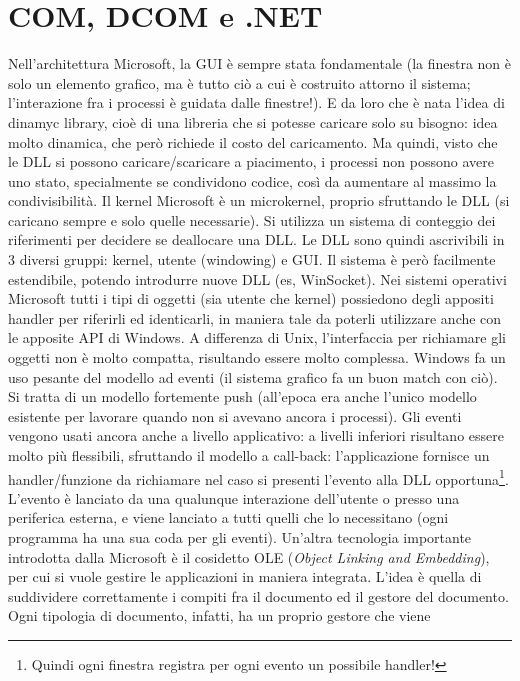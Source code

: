 \section{COM, DCOM e .NET}
Nell'architettura Microsoft, la GUI è sempre stata fondamentale (la finestra non è solo un elemento grafico, ma è tutto
ciò a cui è costruito attorno il sistema; l'interazione fra i processi è guidata dalle finestre!). E da loro che è nata
l'idea di dinamyc library, cioè di una libreria che si potesse caricare solo su bisogno: idea molto dinamica, che però 
richiede il costo del caricamento.
Ma quindi, visto che le DLL si possono caricare/scaricare a piacimento, i processi non possono avere uno stato, 
specialmente se condividono codice, così  da aumentare al massimo la condivisibilità. Il kernel Microsoft è un 
microkernel, proprio sfruttando le DLL (si caricano sempre e solo quelle necessarie).
Si utilizza un sistema di conteggio dei riferimenti per decidere se deallocare una DLL.
Le DLL sono quindi ascrivibili in 3 diversi gruppi: kernel, utente (windowing) e GUI. Il sistema è però facilmente
estendibile, potendo introdurre nuove DLL (es, WinSocket).
Nei sistemi operativi Microsoft tutti i tipi di oggetti (sia utente che kernel) possiedono degli appositi handler per 
riferirli ed identicarli, in maniera tale da poterli utilizzare anche con le apposite API di Windows. A differenza di 
Unix, l'interfaccia per richiamare gli oggetti non è molto compatta, risultando essere molto complessa.
Windows fa un uso pesante del modello ad eventi (il sistema grafico fa un buon match con ciò). Si tratta di un modello 
fortemente push (all'epoca era anche l'unico modello esistente per lavorare quando non si avevano ancora i processi). 
Gli eventi vengono usati ancora anche a livello applicativo: a livelli inferiori risultano essere molto più flessibili, 
sfruttando il modello a call-back: l'applicazione fornisce un handler/funzione da richiamare nel caso si presenti
l'evento alla DLL opportuna\footnote{Quindi ogni finestra registra per ogni evento un possibile handler!}. L'evento è 
lanciato da una qualunque interazione dell'utente o presso una periferica esterna, e viene lanciato a tutti quelli che 
lo necessitano (ogni programma ha una sua coda per gli eventi).
Un'altra tecnologia importante introdotta dalla Microsoft è il cosidetto OLE (\textit{Object Linking and Embedding}), 
per cui si vuole gestire le applicazioni in maniera integrata. L'idea è quella di suddividere correttamente i compiti 
fra il documento ed il gestore del documento. Ogni tipologia di documento, infatti, ha un proprio gestore che viene 
